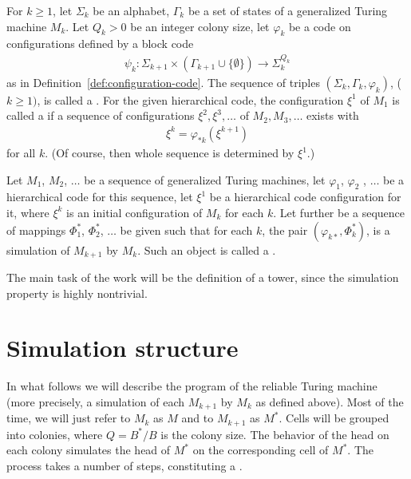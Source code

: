 \documentclass[12pt]{memoir}
\renewcommand{\ge}{\geq}
\def\B{B}
\newcommand{\Q}{Q}
\begin{document}
\begin{definition}\label{def:hierarchical-code}
For \( k\ge 1 \), let \( \Sigma_{k} \) be an alphabet, \( \Gamma_{k} \) be
a set of states of a generalized Turing machine \( M_{k} \).
Let \( \Q_{k}>0 \) be an integer colony size, let \( \varphi_{k} \)
be a code on configurations defined by a block code
  \begin{align*}
       \psi_{k}: \Sigma_{k+1}\times(\Gamma_{k+1}\cup\{\emptyset\})
       \rightarrow \Sigma_{k}^{\Q_{k}}
  \end{align*}
as in Definition~\ref{def:configuration-code}.
The sequence of triples \( (\Sigma_{k},\Gamma_{k},  \varphi_{k}) \), (\( k\ge 1) \),  is
called a .
For the given hierarchical code, the configuration \( \xi^{1} \) of \( M_{1} \)
is called a  if a sequence
of configurations \( \xi^{2},\xi^{3},\dots \) of \( M_{2},M_{3},\dots \) exists with
\begin{align*}
 \xi^{k}=\varphi_{*k}(\xi^{k+1})
 \end{align*} 
for all \( k \).
(Of course, then whole sequence is determined by \( \xi^{1} \).)

Let \( M_{1} \), \( M_{2} \), \( \dots\) be a sequence of generalized Turing machines,
let \( \varphi_{1} \), \( \varphi_{2} \) , \(\dots \) be a hierarchical code for this sequence,
let \( \xi^{1} \) be a hierarchical code configuration for it, where \( \xi^{k} \) is an
initial configuration of \( M_{k} \) for each \( k \).
Let further be a sequence of mappings \( \Phi^{*}_{1} \), \( \Phi^{*}_{2} \), \( \dots \) be
given such that for each \( k \), the pair \( (\varphi_{k*},\Phi_{k}^{*}) \),
is a simulation of \( M_{k+1} \) by \( M_{k} \).
Such an object is called a .
\end{definition}

The main task of the work will be the definition of a tower, since the simulation
property is highly nontrivial.


\section{Simulation structure}

In what follows we will describe the program of the reliable Turing machine
(more precisely, a simulation of each \( M_{k+1} \) by \( M_{k} \) as defined above).
Most of the time, we will just refer to \( M_{k} \) as \( M \) and to \( M_{k+1} \) as
\( M^{*} \).
Cells will be grouped into colonies, where  \( \Q=\B^{*}/\B \) is the colony size.
The behavior of the head on
each colony simulates the head of \( M^{*} \) on the corresponding cell
of \( M^{*} \).
The process takes a number of steps, constituting a .
\end{document}
